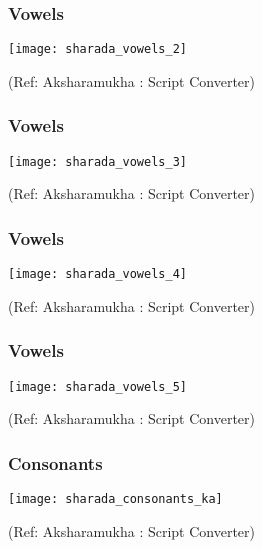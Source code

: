 \begin{frame}[fragile]\frametitle{Vowels}

	\begin{center}
	\texttt{[image: sharada\_vowels\_2]} 
	
	{\tiny (Ref: Aksharamukha : Script Converter)}
	\end{center}	

\end{frame}

\begin{frame}[fragile]\frametitle{Vowels}

	\begin{center}
	\texttt{[image: sharada\_vowels\_3]} 
	
	{\tiny (Ref: Aksharamukha : Script Converter)}
	\end{center}	

\end{frame}

\begin{frame}[fragile]\frametitle{Vowels}

	\begin{center}
	\texttt{[image: sharada\_vowels\_4]} 
	
	{\tiny (Ref: Aksharamukha : Script Converter)}
	\end{center}	

\end{frame}

\begin{frame}[fragile]\frametitle{Vowels}

	\begin{center}
	\texttt{[image: sharada\_vowels\_5]} 
	
	{\tiny (Ref: Aksharamukha : Script Converter)}
	\end{center}	

\end{frame}

\begin{frame}[fragile]\frametitle{Consonants}

	\begin{center}
	\texttt{[image: sharada\_consonants\_ka]} 
	
	{\tiny (Ref: Aksharamukha : Script Converter)}
	\end{center}	

\end{frame}

